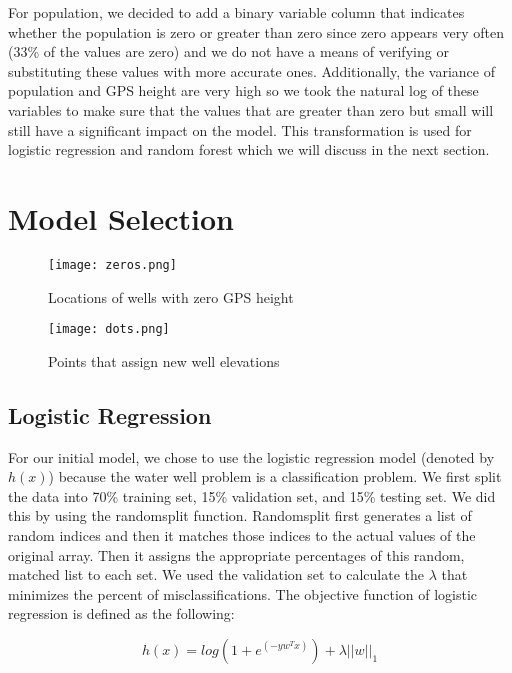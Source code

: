 \documentclass[10pt]{SelfArx} %
\begin{document}
For population, we decided to add a binary variable column that indicates whether the population is zero or greater than zero since zero appears very often (33\% of the values are zero) and we do not have a means of verifying or substituting these values with more accurate ones. Additionally, the variance of population and GPS height are very high so we took the natural log of these variables to make sure that the values that are greater than zero but small will still have a significant impact on the model. This transformation is used for logistic regression and random forest which we will discuss in the next section.

\section{Model Selection}

\begin{figure*}
\centering
\begin{minipage}[b]{.4\textwidth}
\captionsetup{skip=0.5cm}
\texttt{[image: zeros.png]}
\caption{Locations of wells with zero GPS height}\label{a}
\end{minipage}\qquad \qquad \qquad
\begin{minipage}[b]{.4\textwidth}
\captionsetup{skip=0.5cm}
\texttt{[image: dots.png]}
\caption{Points that assign new well elevations}\label{b}
\end{minipage}
\end{figure*}

\subsection{Logistic Regression}

For our initial model, we chose to use the logistic regression model (denoted by $h(x)$) because the water well problem is a classification problem. We first split the data into 70\% training set, 15\% validation set, and 15\% testing set. We did this by using the randomsplit function. Randomsplit first generates a list of random indices and then it matches those indices to the actual values of the original array. Then it assigns the appropriate percentages of this random, matched list to each set. We used the validation set to calculate the $\lambda$ that minimizes the percent of misclassifications. The objective function of logistic regression is defined as the following: 

\begin{equation}
 h(x) = log(1+e^{(-yw^Tx)}) + \lambda||w||_1
\end{equation}
\end{document}
